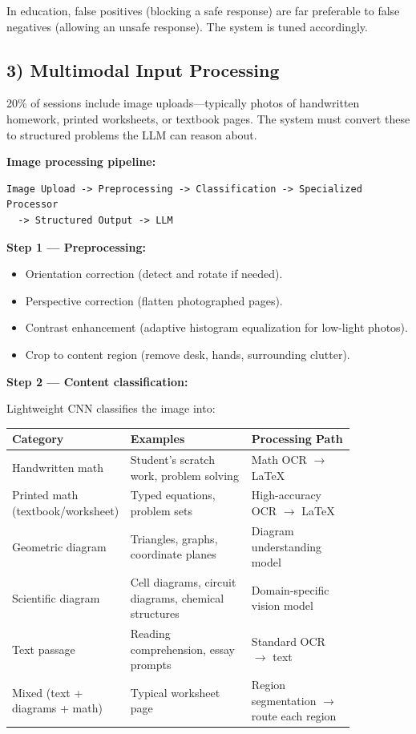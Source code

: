 In education, false positives (blocking a safe response) are far preferable to false negatives (allowing an unsafe response). The system is tuned accordingly.

\subsection*{3) Multimodal Input Processing}

20\% of sessions include image uploads---typically photos of handwritten homework, printed worksheets, or textbook pages. The system must convert these to structured problems the LLM can reason about.

\textbf{Image processing pipeline:}

\begin{verbatim}
Image Upload -> Preprocessing -> Classification -> Specialized Processor
  -> Structured Output -> LLM
\end{verbatim}

\textbf{Step 1 --- Preprocessing:}
\begin{itemize}
  \item Orientation correction (detect and rotate if needed).
  \item Perspective correction (flatten photographed pages).
  \item Contrast enhancement (adaptive histogram equalization for low-light photos).
  \item Crop to content region (remove desk, hands, surrounding clutter).
\end{itemize}

\textbf{Step 2 --- Content classification:}

Lightweight CNN classifies the image into:

\begin{tabular}{|p{0.20\linewidth}|p{0.35\linewidth}|p{0.30\linewidth}|}
\hline
\textbf{Category} & \textbf{Examples} & \textbf{Processing Path} \\
\hline
Handwritten math & Student's scratch work, problem solving & Math OCR $\rightarrow$ LaTeX \\
\hline
Printed math (textbook/worksheet) & Typed equations, problem sets & High-accuracy OCR $\rightarrow$ LaTeX \\
\hline
Geometric diagram & Triangles, graphs, coordinate planes & Diagram understanding model \\
\hline
Scientific diagram & Cell diagrams, circuit diagrams, chemical structures & Domain-specific vision model \\
\hline
Text passage & Reading comprehension, essay prompts & Standard OCR $\rightarrow$ text \\
\hline
Mixed (text + diagrams + math) & Typical worksheet page & Region segmentation $\rightarrow$ route each region \\
\hline
\end{tabular}

